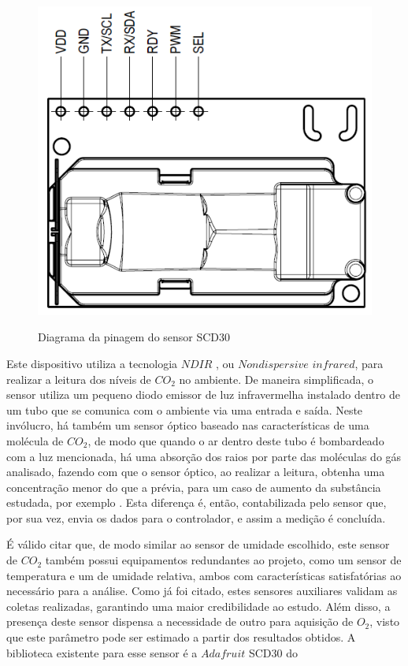 \documentclass[acronym,symbols]{fei}
\begin{document}
\begin{figure}[!htb]
\centering
    \caption{Diagrama da pinagem do sensor SCD30}
    \includegraphics[width=0.6\linewidth]{Imagens/PinCO2.png}
    \label{fig:PinCO2}
\end{figure}

Este dispositivo utiliza a tecnologia $NDIR$ , ou $Nondispersive$ $infrared$, para realizar a leitura dos níveis de $CO_2$ no ambiente. De maneira simplificada, o sensor utiliza um pequeno diodo emissor de luz infravermelha instalado dentro de um tubo que se comunica com o ambiente via uma entrada e saída.  Neste invólucro, há também um sensor óptico baseado nas características de uma molécula de $CO_2$,  de modo que quando o ar dentro deste tubo é bombardeado com a luz mencionada, há uma absorção dos raios por parte das moléculas do gás analisado, fazendo com que o sensor óptico, ao realizar a leitura, obtenha uma concentração menor do que a prévia, para um caso de aumento da substância estudada, por exemplo \cite{NDIR}. Esta diferença é, então, contabilizada pelo sensor que, por sua vez, envia os dados para o controlador, e assim a medição é concluída.

É válido citar que, de modo similar ao sensor de umidade escolhido, este sensor de $CO_2$ também possui equipamentos redundantes ao projeto, como um sensor de temperatura e um de umidade relativa, ambos com características satisfatórias ao necessário para a análise. Como já foi citado, estes sensores auxiliares validam as coletas realizadas, garantindo uma maior credibilidade ao estudo. Além disso, a presença deste sensor dispensa a necessidade de outro para aquisição de $O_2$, visto que este parâmetro pode ser estimado a partir dos resultados obtidos. A biblioteca existente para esse sensor é a $Adafruit$ SCD30 do \textcite{Adafruit_SCD30} 
\end{document}
